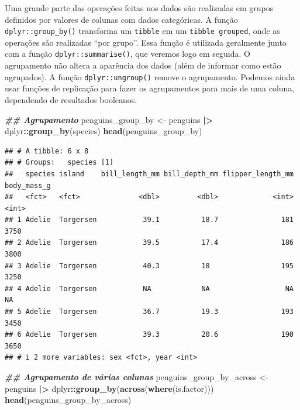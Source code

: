 \documentclass[
]{article}
\newenvironment{Shaded}{\begin{snugshade}}{\end{snugshade}}
\newcommand{\DocumentationTok}[1]{\textcolor[rgb]{0.56,0.35,0.01}{\textbf{\textit{#1}}}}
\newcommand{\FunctionTok}[1]{\textcolor[rgb]{0.13,0.29,0.53}{\textbf{#1}}}
\newcommand{\NormalTok}[1]{#1}
\newcommand{\OtherTok}[1]{\textcolor[rgb]{0.56,0.35,0.01}{#1}}
\newcommand{\SpecialCharTok}[1]{\textcolor[rgb]{0.81,0.36,0.00}{\textbf{#1}}}
\begin{document}
Uma grande parte das operações feitas nos dados são realizadas em grupos definidos por valores de colunas com dados categóricas. A função \texttt{dplyr::group\_by()} transforma um \texttt{tibble} em um \texttt{tibble\ grouped}, onde as operações são realizadas ``por grupo''. Essa função é utilizada geralmente junto com a função \texttt{dplyr::summarise()}, que veremos logo em seguida. O agrupamento não altera a aparência dos dados (além de informar como estão agrupados). A função \texttt{dplyr::ungroup()} remove o agrupamento. Podemos ainda usar funções de replicação para fazer os agrupamentos para mais de uma coluna, dependendo de resultados booleanos.

\begin{Shaded}
\begin{Highlighting}[]
\DocumentationTok{\#\# Agrupamento}
\NormalTok{penguins\_group\_by }\OtherTok{\textless{}{-}}\NormalTok{ penguins }\SpecialCharTok{|\textgreater{}} 
\NormalTok{    dplyr}\SpecialCharTok{::}\FunctionTok{group\_by}\NormalTok{(species)}
\FunctionTok{head}\NormalTok{(penguins\_group\_by)}
\end{Highlighting}
\end{Shaded}

\begin{verbatim}
## # A tibble: 6 x 8
## # Groups:   species [1]
##   species island    bill_length_mm bill_depth_mm flipper_length_mm body_mass_g
##   <fct>   <fct>              <dbl>         <dbl>             <int>       <int>
## 1 Adelie  Torgersen           39.1          18.7               181        3750
## 2 Adelie  Torgersen           39.5          17.4               186        3800
## 3 Adelie  Torgersen           40.3          18                 195        3250
## 4 Adelie  Torgersen           NA            NA                  NA          NA
## 5 Adelie  Torgersen           36.7          19.3               193        3450
## 6 Adelie  Torgersen           39.3          20.6               190        3650
## # i 2 more variables: sex <fct>, year <int>
\end{verbatim}

\begin{Shaded}
\begin{Highlighting}[]
\DocumentationTok{\#\# Agrupamento de várias colunas}
\NormalTok{penguins\_group\_by\_across }\OtherTok{\textless{}{-}}\NormalTok{ penguins }\SpecialCharTok{|\textgreater{}} 
\NormalTok{    dplyr}\SpecialCharTok{::}\FunctionTok{group\_by}\NormalTok{(}\FunctionTok{across}\NormalTok{(}\FunctionTok{where}\NormalTok{(is.factor)))}
\FunctionTok{head}\NormalTok{(penguins\_group\_by\_across)}
\end{Highlighting}
\end{Shaded}
\end{document}
